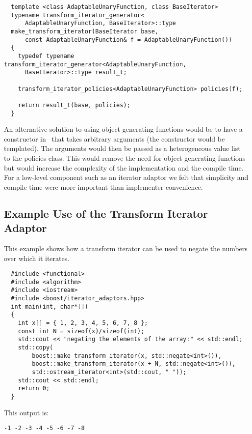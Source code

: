 \documentclass{netobjectdays}
\newcommand{\iteratoradaptor}{\code{iterator\_\-adaptor}}
\begin{document}
{\footnotesize
\begin{verbatim}
  template <class AdaptableUnaryFunction, class BaseIterator>
  typename transform_iterator_generator<
      AdaptableUnaryFunction, BaseIterator>::type
  make_transform_iterator(BaseIterator base,
      const AdaptableUnaryFunction& f = AdaptableUnaryFunction())
  {
    typedef typename transform_iterator_generator<AdaptableUnaryFunction,
      BaseIterator>::type result_t;

    transform_iterator_policies<AdaptableUnaryFunction> policies(f);

    return result_t(base, policies);
  }
\end{verbatim}
}

An alternative solution to using object generating functions would be
to have a constructor in \iteratoradaptor\ that takes arbitrary
arguments (the constructor would be templated). The arguments would
then be passed as a heterogeneous value list~\cite{TMPW00:Eisenecker}
to the policies class. This would remove the need for object
generating functions but would increase the complexity of the
implementation and the compile time. For a low-level component such as
an iterator adaptor we felt that simplicity and compile-time were more
important than implementer convenience.

\subsection{Example Use of the Transform Iterator Adaptor}

This example shows how a transform iterator can be used to
negate the numbers over which it iterates.

{\footnotesize
\begin{verbatim}
  #include <functional>
  #include <algorithm>
  #include <iostream>
  #include <boost/iterator_adaptors.hpp>
  int main(int, char*[])
  {
    int x[] = { 1, 2, 3, 4, 5, 6, 7, 8 };
    const int N = sizeof(x)/sizeof(int);
    std::cout << "negating the elements of the array:" << std::endl;
    std::copy(
        boost::make_transform_iterator(x, std::negate<int>()),
        boost::make_transform_iterator(x + N, std::negate<int>()),
        std::ostream_iterator<int>(std::cout, " "));
    std::cout << std::endl;
    return 0;
  }
\end{verbatim}
}

\noindent This output is: 
{\footnotesize
\begin{verbatim}
-1 -2 -3 -4 -5 -6 -7 -8
\end{verbatim}
}
\end{document}

